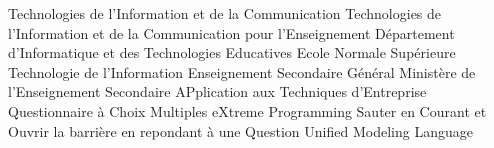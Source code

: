 
 {Technologies de l'Information et de la Communication}
 {Technologies de l'Information et de la Communication pour l'Enseignement}
 {Département d'Informatique et des Technologies Educatives}
 {Ecole Normale Supérieure}
 {Technologie de l'Information}
 {Enseignement Secondaire Général}
 {Ministère de l'Enseignement Secondaire}
 {APplication aux Techniques d'Entreprise}
 {Questionnaire à Choix Multiples }
 {eXtreme Programming }
 {Sauter en Courant et Ouvrir la barrière en repondant à une Question}
 {Unified Modeling Language}
